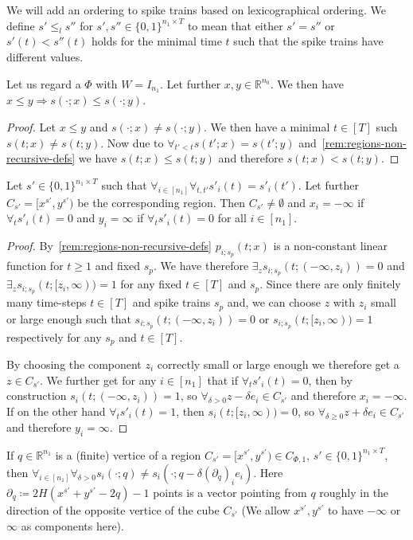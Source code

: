 We will add an ordering to spike trains based on lexicographical ordering. We define \(s'≤_ls''\) for \(s',s''∈\{0,1\}^{n_1×T}\) to mean that either \(s'=s''\) or \(s'(t)<s''(t)\) holds for the minimal time \(t\) such that the spike trains have different values.

\begin{lemma}
  Let us regard a \rdtlifsnn \(Φ\) with \(W=I_{n_1}\).
  Let further \(x,y∈ℝ^{n_0}\). We then have \(x≤y⇒s(·;x)≤s(·;y)\).
\end{lemma}

\begin{proof}
  Let \(x≤y\) and \(s(·;x)≠s(·;y)\). We then have a minimal \(t∈[T]\) such \(s(t;x)≠s(t;y)\). Now due to \(∀_{t'<t}s(t';x)=s(t';y)\) and~\autoref{rem:regions-non-recursive-defs} we have \(s(t;x)≤s(t;y)\) and therefore \(s(t;x)<s(t;y)\).
\end{proof}

\begin{lemma}
  Let \(s'∈\{0,1\}^{n_1×T}\) such that \(∀_{i∈[n_1]}∀_{t,t'}s'_i(t)=s'_i(t')\). Let further \(C_{s'}=[x^{s'},y^{s'})\) be the corresponding region. Then \(C_{s'}≠∅\) and \(x_i=-∞\) if \(∀_ts'_i(t)=0\) and \(y_i=∞\) if \(∀_ts'_i(t)=0\) for all \(i∈[n_1]\).
\end{lemma}

\begin{proof}
  By~\autoref{rem:regions-non-recursive-defs} \(p_{i;s_p}(t;x)\) is a non-constant linear function for \(t≥1\) and fixed \(s_p\). We have therefore \(∃_zs_{i;s_p}(t;(-∞,z_i))=0\) and \(∃_zs_{i;s_p}(t;[z_i,∞))=1\) for any fixed \(t∈[T]\) and \(s_p\). Since there are only finitely many time-steps \(t∈[T]\) and spike trains \(s_p\) and, we can choose \(z\) with \(z_i\) small or large enough such that \(s_{i;s_p}(t;(-∞,z_i))=0\) or \(s_{i;s_p}(t;[z_i,∞))=1\) respectively for any \(s_p\) and \(t∈[T]\).

  By choosing the component \(z_i\) correctly small or large enough we therefore get a \(z∈C_{s'}\). We further get for any \(i∈[n_1]\) that if \(∀_ts'_i(t)=0\), then by construction \(s_i(t;(-∞,z_i))=1\), so \(∀_{δ>0}z-δe_i∈C_{s'}\) and therefore \(x_i=-∞\). If on the other hand \(∀_ts'_i(t)=1\), then \(s_i(t;[z_i,∞))=0\), so \(∀_{δ≥0}z+δe_i∈C_{s'}\) and therefore \(y_i=∞\).
\end{proof}

\begin{lemma}
  If \(q∈ℝ^{n_1}\) is a (finite) vertice of a region \(C_{s'}=[x^{s'},y^{s'})∈C_{Φ,1}\), \(s'∈\{0,1\}^{n_1×T}\), then \(∀_{i∈[n_1]}∀_{δ>0}s_i(·;q)≠s_i(·;q-δ(∂_q)_ie_i)\).
  Here \(∂_q≔2H(x^{s'}+y^{s'}-2q)-1\) points is a vector pointing from \(q\) roughly in the direction of the opposite vertice of the cube \(C_{s'}\) (We allow \(x^{s'},y^{s'}\) to have \(-∞\) or \(∞\) as components here).
\end{lemma}

